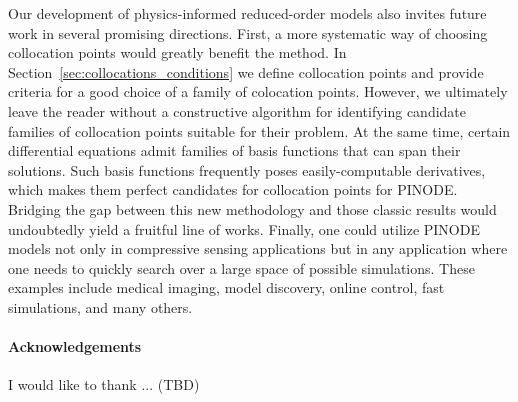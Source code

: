 	Our development of physics-informed reduced-order models also invites future work in several promising directions. First, a more systematic way of choosing collocation points would greatly benefit the method. In Section~\ref{sec:collocations_conditions} we define collocation points and provide criteria for a good choice of a family of colocation points. However, we ultimately leave the reader without a constructive algorithm for identifying candidate families of collocation points suitable for their problem. At the same time, certain differential equations admit families of basis functions that can span their solutions. Such basis functions frequently poses easily-computable derivatives, which makes them perfect candidates for collocation points for PINODE. Bridging the gap between this new methodology and those classic results would undoubtedly yield a fruitful line of works. Finally, one could utilize PINODE models not only in compressive sensing applications but in any application where one needs to quickly search over a large space of possible simulations. These examples include medical imaging, model discovery, online control, fast simulations, and many others.

\paragraph{Acknowledgements} I would like to thank ... (TBD) 
